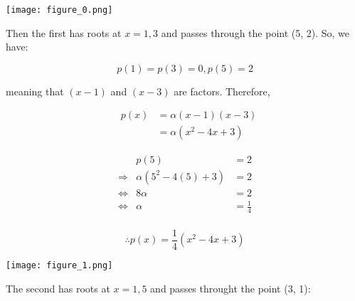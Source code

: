 \documentclass[MathsNotesBase.tex]{subfiles}
\begin{document}
{	\begin{center}
	\texttt{[image: figure\_0.png]}
	\end{center}
	
	
	\begin{par}
	\begin{flushleft}
	Then the first has roots at $x=1,3$ and passes through the point (5, 2). So, we have:
	\end{flushleft}
	\end{par}
	
	\begin{par}
	$$p(1)=p(3)=0, p(5) = 2$$
	\end{par}
	
	\begin{par}
	\begin{flushleft}
	meaning that $\left(x-1\right)$ and $\left(x-3\right)$ are factors. Therefore,
	\end{flushleft}
	\end{par}
	
	\begin{par}
	$$\begin{array}{lcr}
	&p(x) &= \alpha(x-1)(x-3)\\
	&&= \alpha(x^2-4x+3)
	\end{array}$$
	\end{par}
	
	\begin{par}
	$$\begin{array}{lcr}
	&p(5)&=2 \\
	\Longrightarrow &\alpha(5^2-4(5) + 3) &= 2 \\
	\iff &8\alpha&=2\\
	\iff &\alpha &= \frac{1}{4}\\
	\end{array}$$
	\end{par}
	
	\begin{par}
	$$\therefore p(x) = \frac{1}{4}(x^2-4x+3)$$
	\end{par}
	
	
	\begin{center}
	\texttt{[image: figure\_1.png]}
	\end{center}
	
	
	\begin{par}
	\begin{flushleft}
	The second has roots at $x=1,5$ and passes throught the point (3, 1):
	\end{flushleft}
	\end{par}
	
}
\end{document}
